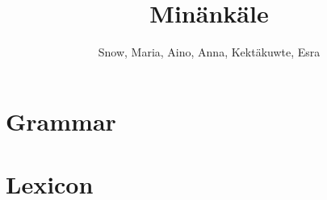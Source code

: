 \documentclass[justified,oneside,notoc]{tufte-book}
\title{Min\"ank\"ale}
\author{Snow, Maria, Aino, Anna, Kekt\"akuwte, Esra}
\begin{document}
\maketitle

\tableofcontents

\part{Grammar}









\part{Lexicon}



\begin{appendices}


\end{appendices}
\nobibliography{}
\end{document}
